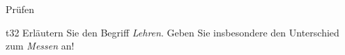 \begin{aufgabe}[Technologie]{Prüfen}
   \begin{teilaufgabe}[ohnenummer]{t}{3}{2}
       Erläutern Sie den Begriff {\it Lehren}. Geben Sie insbesondere den
       Unterschied zum {\it Messen} an!
   \end{teilaufgabe}
   \begin{loesung}
   \end{loesung}
\end{aufgabe}
